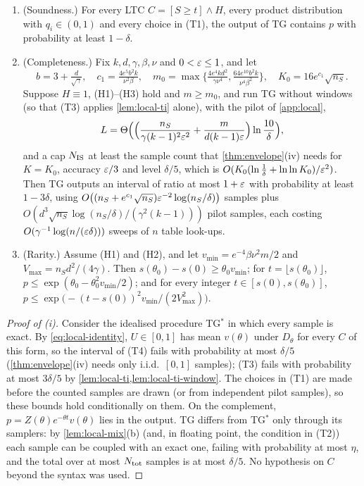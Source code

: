 \begin{theorem}\label{thm:local}
\begin{enumerate}[label=(\roman*)]
\item (Soundness.) For every LTC $C=[S\ge t]\wedge H$, every product distribution with
$q_i\in(0,1)$ and every choice in (T1), the output of TG contains $p$ with probability
at least $1-\delta$.
\item (Completeness.) Fix $k,d,\gamma,\beta,\nu$ and $0<\varepsilon\le1$, and let
\[
b=3+\tfrac{d}{\sqrt\gamma},\quad c_1=\tfrac{4e^5b^2k}{\nu^2\beta},\quad
m_0=\max\Big\{\tfrac{4e^4kd^2}{\gamma\nu^4},\tfrac{64e^{10}b^2k}{\nu^4\beta^2}\Big\},\quad
K_0=16e^{c_1}\sqrt{n_S}.
\]
Suppose $H\equiv1$, (H1)--(H3) hold and $m\ge m_0$, and run TG without windows (so
that (T3) applies \cref{lem:local-ti} alone), with the pilot of \cref{app:local},
\[
L=\Theta\Big(\Big(\frac{n_S}{\gamma(k-1)^2\varepsilon^2}+\frac{m}{d(k-1)\varepsilon}\Big)\ln\frac{10}\delta\Big),
\]
and a cap $N_{\rm IS}$ at least the sample count that \cref{thm:envelope}(iv) needs for
$K=K_0$, accuracy $\varepsilon/3$ and level $\delta/5$, which is
$O(K_0(\ln\frac1\delta+\ln\ln K_0)/\varepsilon^2)$. Then TG
outputs an interval of ratio at most $1+\varepsilon$ with probability at least $1-3\delta$, using
$O\big((n_S+e^{c_1}\sqrt{n_S})\varepsilon^{-2}\log(n_S/\delta)\big)$ samples plus
$O(d^3\sqrt{n_S}\log(n_S/\delta)/(\gamma^2(k-1)))$ pilot samples, each costing
$O(\gamma^{-1}\log(n/(\varepsilon\delta)))$ sweeps of $n$ table look-ups.
\item (Rarity.) Assume (H1) and (H2), and let $v_{\min}=e^{-4}\beta\nu^2m/2$ and
$V_{\max}=n_Sd^2/(4\gamma)$. Then $s(\theta_0)-s(0)\ge\theta_0v_{\min}$; for
$t=\lfloor s(\theta_0)\rfloor$, $p\le\exp(\theta_0-\theta_0^2v_{\min}/2)$; and for every integer
$t\in[s(0),s(\theta_0)]$, $p\le\exp\big(-(t-s(0))^2v_{\min}/(2V_{\max}^2)\big)$.
\end{enumerate}
\end{theorem}

\begin{proof}[Proof of (i)]
Consider the idealised procedure TG$^*$ in which every sample is exact. By
\eqref{eq:local-identity}, $U\in[0,1]$ has mean $v(\theta)$ under $D_\theta$ for every
$C$ of this form, so the interval of (T4) fails with probability at most $\delta/5$
(\cref{thm:envelope}(iv) needs only i.i.d.\ $[0,1]$ samples); (T3) fails with probability
at most $3\delta/5$ by \cref{lem:local-ti,lem:local-ti-window}. The choices in (T1) are made before the
counted samples are drawn (or from independent pilot samples), so these bounds hold
conditionally on them. On the complement, $p=Z(\theta)e^{-\theta t}v(\theta)$ lies in the
output. TG differs from TG$^*$ only through its samplers: by \cref{lem:local-mix}(b)
(and, in floating point, the condition in (T2)) each sample can be coupled with an exact
one, failing with probability at most $\eta$, and the total over at most $N_{\rm tot}$
samples is at most $\delta/5$. No
hypothesis on $C$ beyond the syntax was used.
\end{proof}

